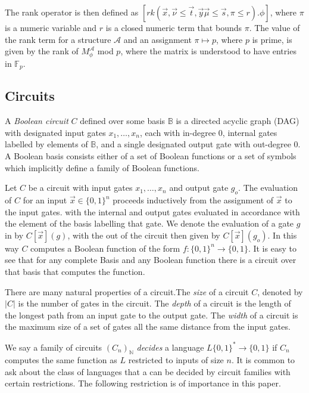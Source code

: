 \documentclass[../paper.tex]{subfiles}
\begin{document}
The rank operator is then defined as $[rk (\vec{x}, \vec {\nu} \leq \vec{t},
\vec{y}\vec{\mu} \leq \vec{s}, \pi \leq r). \phi]$, where $\pi$ is a numeric
variable and $r$ is a closed numeric term that bounds $\pi$. The value of the
rank term for a structure $\mathcal{A}$ and an assignment $\pi \mapsto p$, where
$p$ is prime, is given by the rank  of $M^{\mathcal{A}}_\phi$ mod $p$, where the
matrix is understood to have entries in $\mathbb{F}_p$.

\subsection{Circuits}
A \emph{Boolean circuit} $C$ defined over some basis $\mathbb{B}$ is a directed
acyclic graph (DAG) with designated input gates $x_1, \ldots, x_n$, each with
in-degree $0$, internal gates labelled by elements of $\mathbb{B}$, and a single
designated output gate with out-degree 0. A Boolean basis consists either of a
set of Boolean functions or a set of symbols which implicitly define a family of
Boolean functions.

Let $C$ be a circuit with input gates $x_1, \ldots, x_n$ and output gate $g_o$.
The evaluation of $C$ for an input $\vec{x}\in \{0,1\}^n$ proceeds inductively
from the assignment of $\vec{x}$ to the input gates. with the internal and
output gates evaluated in accordance with the element of the basis labelling
that gate. We denote the evaluation of a gate $g$ in by $C[\vec{x}](g)$, with
the out of the circuit then given by $C[\vec{x}](g_o)$. In this way $C$ computes
a Boolean function of the form $f:\{0,1\}^n \rightarrow \{0,1\}$. It is easy to
see that for any complete Basis and any Boolean function there is a circuit over
that basis that computes the function.


There are many natural properties of a circuit.The \emph{size} of a circuit $C$,
denoted by $\vert C \vert$ is the number of gates in the circuit. The
\emph{depth} of a circuit is the length of the longest path from an input gate
to the output gate. The \emph{width} of a circuit is the maximum size of a set
of gates all the same distance from the input gates.

We say a family of circuits $(C_n)_{\mathbb{N}}$ \emph{decides} a language $L
\{0,1\}^{*} \rightarrow \{0,1\}$ if $C_n$ computes the same function as $L$
restricted to inputs of size $n$. It is common to ask about the class of
languages that a can be decided by circuit families with certain restrictions.
The following restriction is of importance in this paper.
\end{document}
